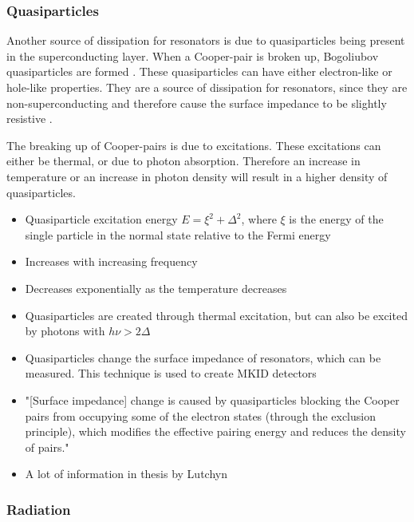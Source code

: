 \documentclass[12pt]{report}
\begin{document}
\subsubsection{Quasiparticles}

Another source of dissipation for resonators is due to quasiparticles being present in the superconducting layer. When a Cooper-pair is broken up, Bogoliubov quasiparticles are formed \cite[p.~16]{Barends}. These quasiparticles can have either electron-like or hole-like properties. They are a source of dissipation for resonators, since they are non-superconducting and therefore cause the surface impedance to be slightly resistive \cite[p.~18]{Mazin}.

The breaking up of Cooper-pairs is due to excitations. These excitations can either be thermal, or due to photon absorption. Therefore an increase in temperature or an increase in photon density will result in a higher density of quasiparticles.

\begin{itemize}
    \item Quasiparticle excitation energy $E = \xi^2 + \Delta ^2$,
        where $\xi$ is the energy of the single particle in the normal state relative to the Fermi energy \cite{Barends}
    \item Increases with increasing frequency
    \item Decreases exponentially as the temperature decreases \cite[p.~19?]{Mazin}
    \item Quasiparticles are created through thermal excitation, but can also be excited by photons with $h \nu > 2 \Delta$\cite{Gao}
    \item Quasiparticles change the surface impedance of resonators, which can be measured.
        This technique is used to create MKID detectors \cite{Gao}
    \item "[Surface impedance] change is caused by quasiparticles blocking
        the Cooper pairs from occupying some of the electron states (through the exclusion principle), which
        modifies the effective pairing energy and reduces the density of pairs."\cite[p.~3]{Mazin}
    \item A lot of information in thesis by Lutchyn \cite{Lutchyn}
\end{itemize}




\subsubsection{Radiation}
\end{document}
